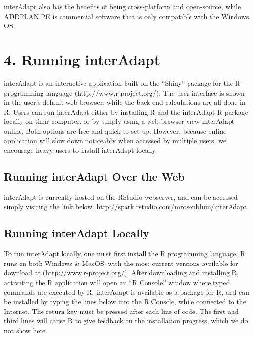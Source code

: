 \documentclass{article}
\newcommand{\interAdapt}{\textsf{interAdapt }}
\begin{document}
\interAdapt also has the benefits of being cross-platform and open-source, while ADDPLAN PE is commercial software that is only compatible with the Windows OS.

\section*{4. Running \interAdapt}

\interAdapt is an interactive application built on the ``Shiny'' package for the R programming language (\url{http://www.r-project.org/}). The user interface is shown in the user’s default web browser, while the back-end calculations are all done in R. Users can run \interAdapt either by installing R and the \interAdapt R package locally on their computer, or by simply using a web browser view \interAdapt online. Both options are free and quick to set up. However, because online application will slow down noticeably when accessed by multiple users, we encourage heavy users to install \interAdapt locally.


\subsection*{Running \interAdapt  Over the Web}

\interAdapt is currently hosted on the RStudio webserver, and can be accessed simply visiting the link below.
\url{http://spark.rstudio.com/mrosenblum/interAdapt}

\subsection*{Running \interAdapt Locally}



To run \interAdapt locally, one must first install the R programming language. R runs on both Windows \& MacOS, with the most current versions available for download at (\url{http://www.r-project.org/}). After downloading and installing R, activating the R application will open an ``R Console'' window where typed commands are executed by R. interAdapt is available as a package for R, and can be installed by typing the lines below into the R Console, while connected to the Internet. The return key must be pressed after each line of code. The first and third lines will cause R to give feedback on the installation progress, which we do not show here.
\end{document}
